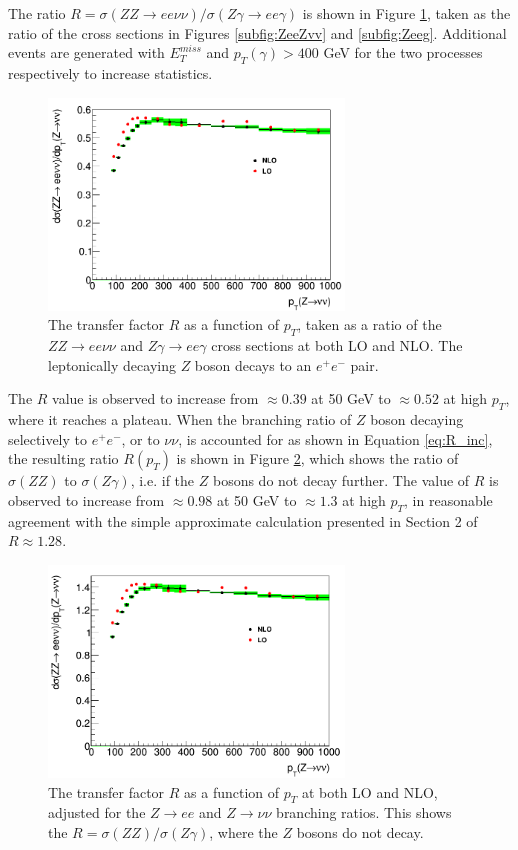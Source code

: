 \documentclass[11pt,a4paper]{report}
\newcommand{\met}{$E_T^{miss}$ }
\begin{document}
The ratio $R = \sigma(ZZ\rightarrow ee\nu\nu)/\sigma(Z\gamma\rightarrow ee\gamma)$ is shown in Figure \ref{fig:Rcurve}, taken as the ratio of the cross sections in Figures \ref{subfig:ZeeZvv} and \ref{subfig:Zeeg}. Additional events are generated with \met and $p_T(\gamma) > 400$ GeV for the two processes respectively to increase statistics. 
\begin{figure}[H]
	\centering
	\includegraphics[width= 0.7\textwidth]{Ratio_default.png}
	\caption{The transfer factor $R$ as a function of $p_T$, taken as a ratio of  the $ZZ\to ee\nu\nu$ and $Z\gamma\to ee\gamma$ cross sections at both LO and NLO. The leptonically decaying $Z$ boson decays to an $e^+e^-$ pair.}
	\label{fig:Rcurve}
\end{figure}
The $R$ value is observed to increase from $\approx 0.39$ at 50 GeV to $\approx 0.52$ at high $p_T$, where it reaches a plateau. When the branching ratio of $Z$ boson decaying selectively to $e^+e^-$, or to $\nu\nu$, is accounted for as shown in Equation \ref{eq:R_inc}, the resulting ratio $R(p_T)$ is shown in Figure \ref{fig:RcurveBR}, which shows the ratio of $\sigma(ZZ)$ to $\sigma(Z\gamma)$, i.e. if the $Z$ bosons do not decay further. The value of $R$ is observed to increase from $\approx 0.98$ at 50 GeV to $\approx 1.3$ at high $p_T$, in reasonable agreement with the simple approximate calculation presented in Section 2 of $R \approx 1.28$.
\begin{figure}[H]
	\centering
	\includegraphics[width = 0.7\textwidth]{Ratio_with_BR.png}
	\caption{The transfer factor $R$ as a function of $p_T$ at both LO and NLO, adjusted for the $Z\rightarrow ee$ and $Z\rightarrow \nu\nu$ branching ratios. This shows the $R=\sigma(ZZ)/\sigma(Z\gamma)$, where the $Z$ bosons do not decay.}
	\label{fig:RcurveBR}
\end{figure}
\end{document}
